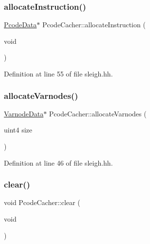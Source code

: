 \subsubsection{\texorpdfstring{allocateInstruction()}{allocateInstruction()}}
{\footnotesize\ttfamily \mbox{\hyperlink{struct_pcode_data}{Pcode\+Data}}$\ast$ Pcode\+Cacher\+::allocate\+Instruction (\begin{DoxyParamCaption}\item[{void}]{ }\end{DoxyParamCaption})\hspace{0.3cm}{\ttfamily [inline]}}



Definition at line 55 of file sleigh.\+hh.

\mbox{\label{class_pcode_cacher_adea4c5effe401cd5d08eafa7dcf7940d}} 
\subsubsection{\texorpdfstring{allocateVarnodes()}{allocateVarnodes()}}
{\footnotesize\ttfamily \mbox{\hyperlink{struct_varnode_data}{Varnode\+Data}}$\ast$ Pcode\+Cacher\+::allocate\+Varnodes (\begin{DoxyParamCaption}\item[{uint4}]{size }\end{DoxyParamCaption})\hspace{0.3cm}{\ttfamily [inline]}}



Definition at line 46 of file sleigh.\+hh.

\mbox{\label{class_pcode_cacher_afa7aaee06ffc63d4200619c52728181e}} 
\subsubsection{\texorpdfstring{clear()}{clear()}}
{\footnotesize\ttfamily void Pcode\+Cacher\+::clear (\begin{DoxyParamCaption}\item[{void}]{ }\end{DoxyParamCaption})}



